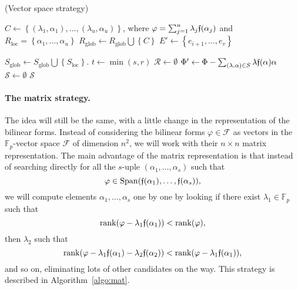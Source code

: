 \documentclass[a4paper,11pt]{article}
\begin{document}
\begin{algorithm}
  \caption{(Vector space strategy)}\label{algo:vect}
  \begin{algorithmic}[1]

    \State $C\gets \left\{ (\lambda_1, \alpha_1), \dots, (\lambda_u, \alpha_u)
    \right\}$, where $\varphi=\sum_{j=1}^u \lambda_j\mathfrak{f}(\alpha_j)$ and
    $R_\text{loc}=\left\{ \alpha_1, \dots, \alpha_u \right\}$
    \State $R_\text{glob}\gets R_\text{glob}\bigcup\left\{C\right\}$
    \State $E'\gets \left\{ e_{i+1}, \dots, e_v \right\}$
    \State {}
    \EndFor
    \EndIf
    \EndProcedure

      \State $S_\text{glob}\gets S_\text{glob}\bigcup \left\{S_\text{loc}\right\}$. 
      \Else
        \State $t\gets\min(s, r)$
        \State $\mathcal R\gets\emptyset$
        \State {}
        \State $\Phi'\gets\Phi-\sum_{(\lambda, \alpha)\in
        S}\lambda\mathfrak{f}(\alpha)\alpha$
        \State {}
        \EndFor
      \EndIf
    \EndProcedure
    \State $\mathcal S\gets\emptyset$
    \State {}
    \State \Return $\mathcal S$
  \end{algorithmic}
\end{algorithm}

\paragraph{The matrix strategy.}
The idea will still be the same, with a little change in the representation of
the bilinear forms. Instead of considering the bilinear forms
$\varphi\in\mathcal F$ as vectors in the $\mathbb{F}_{p}$-vector
space $\mathcal F$ of dimension $n^2$, we will work with their $n\times n$ matrix
representation. The main advantage of the matrix representation is that instead
of searching directly for all the $s$-uple $(\alpha_1, \dots, \alpha_s)$ such
that
\[
  \varphi\in\operatorname{Span}(\mathfrak{f}(\alpha_1), \dots, \mathfrak{f}(\alpha_s)),
\]
we will compute elements $\alpha_1, \dots, \alpha_s$ one by one by looking if
there exist $\lambda_1\in\mathbb{F}_p$ such that
\[
  \operatorname{rank}(\varphi-\lambda_1\mathfrak{f}(\alpha_1))<\operatorname{rank}(\varphi),
\]
then $\lambda_2$ such that
\[
  \operatorname{rank}(\varphi-\lambda_1\mathfrak{f}(\alpha_1)-\lambda_2\mathfrak{f}(\alpha_2))<\operatorname{rank}(\varphi-\lambda_1\mathfrak{f}(\alpha_1)),
\]
and so on, eliminating lots of other candidates on the way. This strategy
is described in Algorithm~\ref{algo:mat}.
\end{document}
